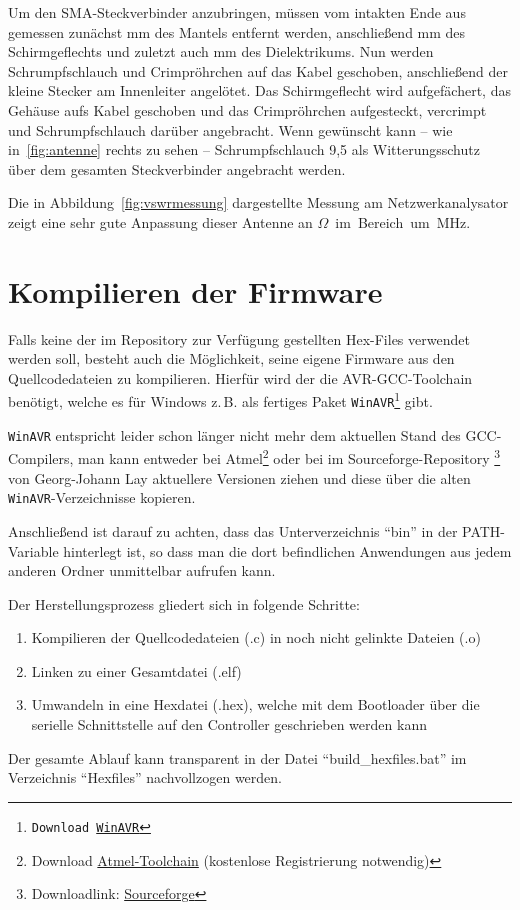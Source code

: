 \documentclass[pdftex, parskip, numbers=noenddot, toc=listof]{scrbook}
\begin{document}
	Um den SMA-Steckverbinder anzubringen, müssen vom intakten Ende aus gemessen zunächst \unit[12]{mm} des Mantels entfernt werden, anschließend \unit[8]{mm} des Schirmgeflechts und zuletzt auch \unit[4]{mm} des Dielektrikums. Nun werden Schrumpfschlauch und Crimpröhrchen auf das Kabel geschoben, anschließend der kleine Stecker am Innenleiter angelötet. Das Schirmgeflecht wird aufgefächert, das Gehäuse aufs Kabel geschoben und das Crimpröhrchen aufgesteckt, vercrimpt und Schrumpfschlauch darüber angebracht. Wenn gewünscht kann -- wie in~\ref{fig:antenne} rechts zu sehen -- Schrumpfschlauch 9{,}5 als Witterungsschutz über dem gesamten Steckverbinder angebracht werden.

	Die in Abbildung~\ref{fig:vswrmessung} dargestellte Messung am Netzwerkanalysator zeigt eine sehr gute Anpassung dieser Antenne an \unit[50]{$\Omega$} im Bereich um \unit[868]{MHz}.



	\section{Kompilieren der Firmware}

	Falls keine der im Repository zur Verfügung gestellten Hex-Files verwendet werden soll, besteht auch die Möglichkeit, seine eigene Firmware aus den Quellcodedateien zu kompilieren. Hierfür wird der die AVR-GCC-Toolchain benötigt, welche es für Windows z.\,B. als fertiges Paket \texttt{WinAVR\footnote{Download \href{http://sourceforge.net/projects/winavr/files/}{WinAVR}}} gibt.

	\texttt{WinAVR} entspricht leider schon länger nicht mehr dem aktuellen Stand des GCC-Compilers, man kann entweder bei Atmel\footnote{Download \href{http://www.atmel.com/tools/ATMELAVRTOOLCHAINFORWINDOWS.aspx}{Atmel-Toolchain} (kostenlose Registrierung notwendig)} oder bei im Sourceforge-Repository%
	\footnote{Downloadlink: \href{http://sourceforge.net/projects/mobilechessboar/files}{Sourceforge}} von Georg-Johann Lay aktuellere Versionen ziehen und diese über die alten \texttt{WinAVR}-Verzeichnisse kopieren.

	Anschließend ist darauf zu achten, dass das Unterverzeichnis \enquote{bin} in der PATH-Variable hinterlegt ist, so dass man die dort befindlichen Anwendungen aus jedem anderen Ordner unmittelbar aufrufen kann.

	Der Herstellungsprozess gliedert sich in folgende Schritte:
	\begin{enumerate}
		\item Kompilieren der Quellcodedateien (.c) in noch nicht gelinkte Dateien (.o)
		\item Linken zu einer Gesamtdatei (.elf)
		\item Umwandeln in eine Hexdatei (.hex), welche mit dem Bootloader über die serielle Schnittstelle auf den Controller geschrieben werden kann
	\end{enumerate}

	Der gesamte Ablauf kann transparent in der Datei \enquote{build\_hexfiles.bat} im Verzeichnis \enquote{Hexfiles} nachvollzogen werden.
	\listoffigures
	\listoftables
\end{document}
